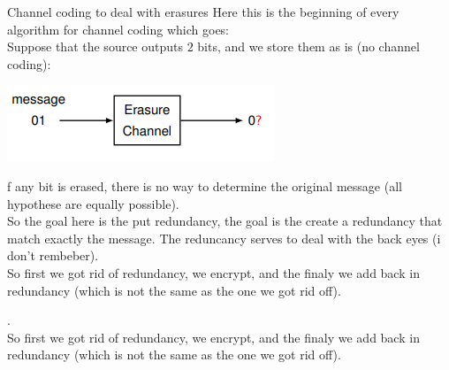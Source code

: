 \begin{parag}{Channel coding to deal with erasures}
    Here this is the beginning of every algorithm for channel coding which goes:\\
    Suppose that the source outputs $2$ bits, and we store them as is (no channel coding):
\begin{center}
    \includegraphics[scale=1.2]{22025-04-29.png}
    
\end{center}
f any bit is erased, there is no way to determine the original message (all hypothese are equally possible).\\
So the goal here is the put redundancy, the goal is the create a redundancy that match exactly the message. The reduncancy serves to deal with the back eyes (i don't rembeber).\\
So first we got rid of redundancy, we encrypt, and the finaly we add back in redundancy (which is not the same as the one we got rid off).
    
\end{parag}

.\\
So first we got rid of redundancy, we encrypt, and the finaly we add back in redundancy (which is not the same as the one we got rid off).












